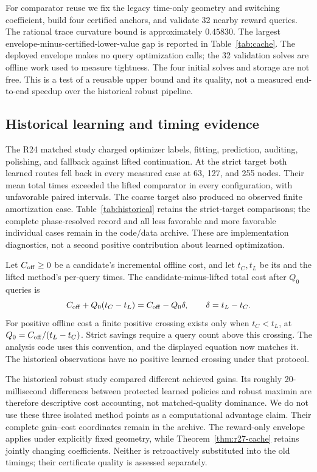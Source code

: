 For comparator reuse we fix the legacy time-only geometry and switching coefficient, build four certified anchors, and validate 32 nearby reward queries. The rational trace curvature bound is approximately $0.45830$. The largest envelope-minus-certified-lower-value gap is reported in Table~\ref{tab:cache}. The deployed envelope makes no query optimization calls; the 32 validation solves are offline work used to measure tightness. The four initial solves and storage are not free. This is a test of a reusable upper bound and its quality, not a measured end-to-end speedup over the historical robust pipeline.




\subsection{Historical learning and timing evidence}
The R24 matched study charged optimizer labels, fitting, prediction, auditing, polishing, and fallback against lifted continuation. At the strict target both learned routes fell back in every measured case at 63, 127, and 255 nodes. Their mean total times exceeded the lifted comparator in every configuration, with unfavorable paired intervals. The coarse target also produced no observed finite amortization case. Table~\ref{tab:historical} retains the strict-target comparisons; the complete phase-resolved record and all less favorable and more favorable individual cases remain in the code/data archive. These are implementation diagnostics, not a second positive contribution about learned optimization.

Let $C_{\rm off}\geq0$ be a candidate's incremental offline cost, and let $t_C,t_L$ be its and the lifted method's per-query times. The candidate-minus-lifted total cost after $Q_0$ queries is
\begin{equation}\label{eq:amortization}
 C_{\rm off}+Q_0(t_C-t_L)=C_{\rm off}-Q_0\delta,
 \qquad \delta=t_L-t_C.
\end{equation}
For positive offline cost a finite positive crossing exists only when $t_C<t_L$, at $Q_0=C_{\rm off}/(t_L-t_C)$. Strict savings require a query count above this crossing. The analysis code uses this convention, and the displayed equation now matches it. The historical observations have no positive learned crossing under that protocol.


The historical robust study compared different achieved gains. Its roughly 20-millisecond differences between protected learned policies and robust maximin are therefore descriptive cost accounting, not matched-quality dominance. We do not use these three isolated method points as a computational advantage claim. Their complete gain--cost coordinates remain in the archive. The reward-only envelope applies under explicitly fixed geometry, while Theorem~\ref{thm:r27-cache} retains jointly changing coefficients. Neither is retroactively substituted into the old timings; their certificate quality is assessed separately.

